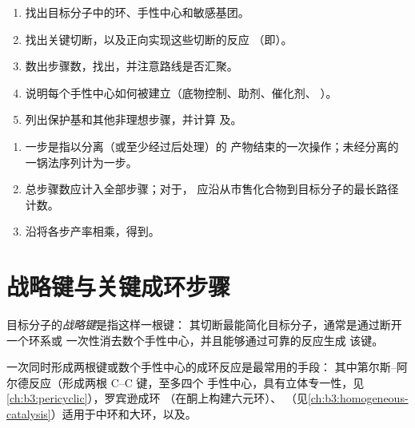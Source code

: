\begin{method}[分析全合成路线]\label{met:b3:total-synthesis:analyse}
\begin{enumerate}
  \item 找出目标分子中的环、手性中心和敏感基团。
  \item 找出关键切断，以及正向实现这些切断的反应
        （即）。
  \item 数出步骤数，找出，并注意路线是否汇聚。
  \item 说明每个手性中心如何被建立（底物控制、助剂、催化剂、
        ）。
  \item 列出保护基和其他非理想步骤，并计算
        及。
\end{enumerate}
\end{method}

\begin{method}[步骤计数]\label{met:b3:total-synthesis:count}
\begin{enumerate}
  \item 一步是指以分离（或至少经过后处理）的
        产物结束的一次操作；未经分离的一锅法序列计为一步。
  \item 总步骤数应计入全部步骤；对于，
        应沿从市售化合物到目标分子的最长路径计数。
  \item 沿将各步产率相乘，得到。
\end{enumerate}
\end{method}

\section{战略键与关键成环步骤}

\begin{definition}[战略键]\label{def:b3:total-synthesis:strategic-bond}
目标分子的\emph{战略键}是指这样一根键：
其切断最能简化目标分子，通常是通过断开一个环系或
一次性消去数个手性中心，并且能够通过可靠的反应生成
该键。
\end{definition}

一次同时形成两根键或数个手性中心的成环反应是最常用的手段：
其中第尔斯–阿尔德反应（形成两根 C--C 键，至多四个
手性中心，具有立体专一性，见\cref{ch:b3:pericyclic}），罗宾逊成环
（在酮上构建六元环）、
（见\cref{ch:b3:homogeneous-catalysis}）适用于中环和大环，以及。

